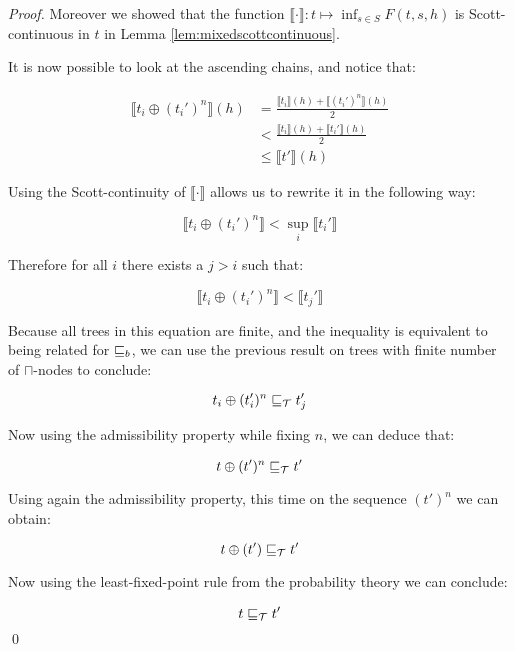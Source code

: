\begin{proof}
    Moreover we showed that the function
    $\llbracket \cdot \rrbracket : t \mapsto \inf_{s \in S} F (t,s,h)$
    is Scott-continuous in $t$ in Lemma \ref{lem:mixedscottcontinuous}.
    
    It is now possible to look at the ascending chains, and 
    notice that:

    \begin{align*}
        \llbracket t_i \oplus (t_i')^n \rrbracket(h) &= \frac{\llbracket t_i
        \rrbracket(h) + \llbracket (t_i')^n \rrbracket (h)}{2} \\
        &< 
        \frac{\llbracket t_i \rrbracket(h) + \llbracket t_i' \rrbracket (h)}{2} \\
        &\leq \llbracket t' \rrbracket(h)
    \end{align*}
    
    Using the Scott-continuity of $\llbracket \cdot \rrbracket$ allows us to 
    rewrite it in the following way:

    \begin{equation*}
        \llbracket t_i \oplus (t_i')^n \rrbracket < \sup_i \llbracket t_i' \rrbracket
    \end{equation*}

    Therefore for all $i$ there exists a $j>i$ such that:

    \begin{equation*}
        \llbracket t_i \oplus (t_i')^n \rrbracket < \llbracket t_j' \rrbracket
    \end{equation*}

    Because all trees in this equation are finite, and the inequality is
    equivalent to being related for $\sqsubseteq_b$, we can use the previous 
    result on trees with finite number of $\sqcap$-nodes to conclude:

    \begin{equation*}
        t_i \oplus (t_i')^n \sqsubseteq_\mathcal{T} t_j'
    \end{equation*}

    Now using the admissibility property while fixing $n$, we can deduce that:

    \begin{equation*}
        t \oplus (t')^n \sqsubseteq_\mathcal{T} t'
    \end{equation*}

    Using again the admissibility property, this time on the sequence $(t')^n$ 
    we can obtain:

    \begin{equation*}
        t \oplus (t') \sqsubseteq_\mathcal{T} t'
    \end{equation*}

    Now using the least-fixed-point rule from the probability theory we can 
    conclude:

    \begin{equation*}
        t \sqsubseteq_\mathcal{T} t'
    \end{equation*}
    \qed
\end{proof}

